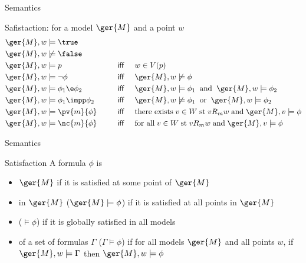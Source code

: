 \documentclass{beamer}
\begin{document}
\begin{slide}{Semantics}\label{s:13}
\small
\begin{block}{Safistaction: for a model $\ger{M}$ and a point $w$}
\begin{align*}
\ger{M}, w & \models \true &&\\
\ger{M}, w & \not \models  \false &&\\
\ger{M}, w & \models  p &  \text{~~~ \textsf{iff} ~~~}  & w \in V(p)\\
\ger{M}, w  & \models \neg \phi  & \text{~~~ \textsf{iff} ~~~} & \ger{M}, w  \not \models \phi \\
\ger{M}, w & \models \phi_1 \e \phi_2  &\text{~~~ \textsf{iff} ~~~} & \ger{M}, w \models  \phi_1 \;\; \text{and}\;\;
                                                   \ger{M}, w \models  \phi_2 \\
\ger{M}, w & \models \phi_1 \impp \phi_2 & \text{~~~ \textsf{iff} ~~~} & \ger{M}, w \not \models \phi_1  \;\; \text{or}\;\; 
                                                  \ger{M}, w \models \phi_2 \\
\ger{M}, w  &\models \pv{m}{\phi} & \text{ ~~~ \textsf{iff} ~~~} &
\text{there exists}\; v \in W \;\text{st}\; v R_m w\; \text{and}\; \ger{M}, v \models \phi\\
\ger{M}, w & \models \nc{m}{\phi} & \text{~~~ \textsf{iff} ~~~} &
\text{for all}\; v \in W \; \text{st}\; v R_m w\; \text{and}\; \ger{M}, v \models \phi\\
\end{align*}
\end{block}
\end{slide}


\begin{slide}{Semantics}\label{s:14}
\small
\begin{block}{Satisfaction}
A formula $\phi$ is
\begin{itemize}
\item {}  $\ger{M}$ if it is satisfied at some point of $\ger{M}$
\item {} in $\ger{M}$ ($\ger{M} \models \phi$) if it is satisfied at all points in $\ger{M}$
\item {} ($\models \phi$) if it is globally satisfied in all models
\item {} of a set of formulas $\Gamma$ ($\Gamma \models \phi$) if for all models $\ger{M}$ and all
points $w$, if $\ger{M}, w \models \Gamma$ then $\ger{M}, w \models \phi$
\end{itemize}
\end{block}
\end{slide}
\end{document}
